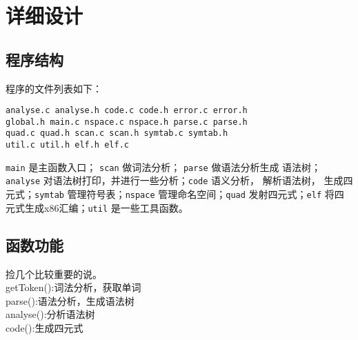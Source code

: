 \section{详细设计}
\subsection{程序结构}
程序的文件列表如下：
\begin{verbatim}
analyse.c analyse.h code.c code.h error.c error.h
global.h main.c nspace.c nspace.h parse.c parse.h
quad.c quad.h scan.c scan.h symtab.c symtab.h
util.c util.h elf.h elf.c
\end{verbatim}
\verb|main| 是主函数入口； \verb|scan| 做词法分析； \verb|parse| 做语法分析生成
语法树； \verb|analyse| 对语法树打印，并进行一些分析；\verb|code| 语义分析，
解析语法树，
生成四元式；\verb|symtab| 管理符号表；\verb|nspace| 管理命名空间；\verb|quad|
发射四元式；\verb|elf| 将四元式生成x86汇编；\verb|util| 是一些工具函数。
\subsection{函数功能}
捡几个比较重要的说。\\
getToken():词法分析，获取单词\\
parse():语法分析，生成语法树\\
analyse():分析语法树\\
code():生成四元式
